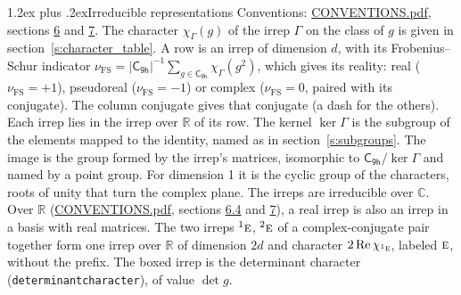 \documentclass[10pt,a4paper]{article}
\makeatletter
\renewcommand\section{\@startsection{section}{1}{\z@}{-3ex plus -1ex minus -.2ex}%
  {1.2ex plus .2ex}{\normalfont\large\sffamily\bfseries\color{parttitle}}}
\numberwithin{equation}{section}
\newcommand{\grp}[1]{\mathsf{#1}}
\newcommand{\irr}[1]{\text{\normalfont\scshape #1}}
\newcommand{\conjpair}[1]{{}^{#1}}
\newcommand{\irchar}[1]{\chi_{#1}}
\newcommand{\fsind}{\nu_{\mathrm{FS}}}
\makeatother
\begin{document}
\section{Irreducible representations}\label{s:irreps}
Conventions: \href{../../CONVENTIONS.pdf}{CONVENTIONS.pdf}, sections \href{../../CONVENTIONS.pdf\#conv.6}{6} and \href{../../CONVENTIONS.pdf\#conv.7}{7}.
\leavevmode\label{n:function.character}\label{n:irrep.Gamma}The character $\irchar{\Gamma}(g)$ of the irrep $\Gamma$ on the class of $g$ is given in section~\ref{s:character_table}.
\leavevmode\label{n:index.dimension}\label{n:index.frobenius}\label{n:head.irrep}\label{n:head.reality}A row is an irrep of dimension $d$, with its Frobenius--Schur indicator $\fsind = |\grp{C_{9h}}|^{-1}\allowbreak\sum_{g\in\grp{C_{9h}}}\irchar{\Gamma}(g^2)$, which gives its reality: real ($\fsind = +1$), pseudoreal ($\fsind = -1$) or complex ($\fsind = 0$, paired with its conjugate). \label{n:head.conjugate}The column conjugate gives that conjugate (a dash for the others). \label{n:head.over.real}Each irrep lies in the irrep over $\mathbb{R}$ of its row. \label{n:head.kernel}The kernel $\ker\Gamma$ is the subgroup of the elements mapped to the identity, named as in section~\ref{s:subgroups}. \label{n:head.image}The image is the group formed by the irrep's matrices, isomorphic to $\grp{C_{9h}}/\ker\Gamma$ and named by a point group. For dimension 1 it is the cyclic group of the characters, roots of unity that turn the complex plane. The irreps are irreducible over $\mathbb{C}$. Over $\mathbb{R}$ (\href{../../CONVENTIONS.pdf}{CONVENTIONS.pdf}, sections \href{../../CONVENTIONS.pdf\#conv.6.4}{6.4} and \href{../../CONVENTIONS.pdf\#conv.7}{7}), a real irrep is also an irrep in a basis with real matrices. The two irreps $\conjpair{1}\irr{e}$, $\conjpair{2}\irr{e}$ of a complex-conjugate pair together form one irrep over $\mathbb{R}$ of dimension $2d$ and character $2\operatorname{Re}\irchar{\conjpair{1}\irr{e}}$, labeled $\irr{e}$, without the prefix. \label{n:mark.determinant}The boxed irrep is the determinant character (\texttt{determinantcharacter}), of value $\det g$.
\setlength{\emergencystretch}{2em}\par\setlength{\emergencystretch}{0pt}
\end{document}
